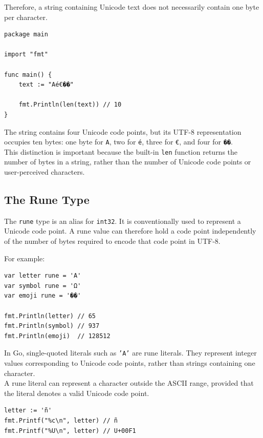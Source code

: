 Therefore, a string containing Unicode text does not necessarily contain one byte per character.

\begin{lstlisting}
package main

import "fmt"

func main() {
    text := "Aé€��"

    fmt.Println(len(text)) // 10
}
\end{lstlisting}

The string contains four Unicode code points, but its UTF-8 representation occupies ten bytes: one byte for \texttt{A}, two for \texttt{é}, three for \texttt{€}, and four for \texttt{��}.\\

This distinction is important because the built-in \texttt{len} function returns the number of bytes in a string, rather than the number of Unicode code points or user-perceived characters.

\subsection{The Rune Type}

The \texttt{rune} type is an alias for \texttt{int32}. It is conventionally used to represent a Unicode code point. A rune value can therefore hold a code point independently of the number of bytes required to encode that code point in UTF-8.

For example:

\begin{lstlisting}
var letter rune = 'A'
var symbol rune = 'Ω'
var emoji rune = '��'

fmt.Println(letter) // 65
fmt.Println(symbol) // 937
fmt.Println(emoji)  // 128512
\end{lstlisting}

In Go, single-quoted literals such as \texttt{'A'} are rune literals. They represent integer values corresponding to Unicode code points, rather than strings containing one character.\\

A rune literal can represent a character outside the ASCII range, provided that the literal denotes a valid Unicode code point.

\begin{lstlisting}
letter := 'ñ'
fmt.Printf("%c\n", letter) // ñ
fmt.Printf("%U\n", letter) // U+00F1
\end{lstlisting}

